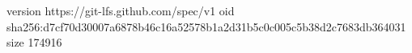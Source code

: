 version https://git-lfs.github.com/spec/v1
oid sha256:d7cf70d30007a6878b46c16a52578b1a2d31b5c0c005c5b38d2c7683db364031
size 174916
